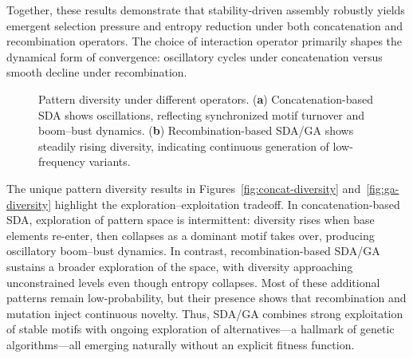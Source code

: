 \documentclass[life,article,submit,pdftex,moreauthors]{Definitions/mdpi}
\begin{document}
Together, these results demonstrate that stability-driven assembly robustly yields emergent selection pressure and entropy reduction under both concatenation and recombination operators. The choice of interaction operator primarily shapes the dynamical form of convergence: oscillatory cycles under concatenation versus smooth decline under recombination.

\begin{figure}[H]
\centering
{}
\hfill
{}
\caption{Pattern diversity under different operators. (\textbf{a}) Concatenation-based SDA shows oscillations, reflecting synchronized motif turnover and boom--bust dynamics. (\textbf{b}) Recombination-based SDA/GA shows steadily rising diversity, indicating continuous generation of low-frequency variants.}
\label{fig:diversity-comparison}
\end{figure}


The unique pattern diversity results in Figures~\ref{fig:concat-diversity} and~\ref{fig:ga-diversity} highlight the exploration--exploitation tradeoff. 
In concatenation-based SDA, exploration of pattern space is intermittent: 
diversity rises when base elements re-enter, then collapses as a dominant 
motif takes over, producing oscillatory boom--bust dynamics. In contrast, 
recombination-based SDA/GA sustains a broader exploration of the space, 
with diversity approaching unconstrained levels even though entropy 
collapses. Most of these additional patterns remain low-probability, but 
their presence shows that recombination and mutation inject continuous 
novelty. Thus, SDA/GA combines strong exploitation of stable motifs with 
ongoing exploration of alternatives---a hallmark of genetic algorithms---all 
emerging naturally without an explicit fitness function.
\end{document}
